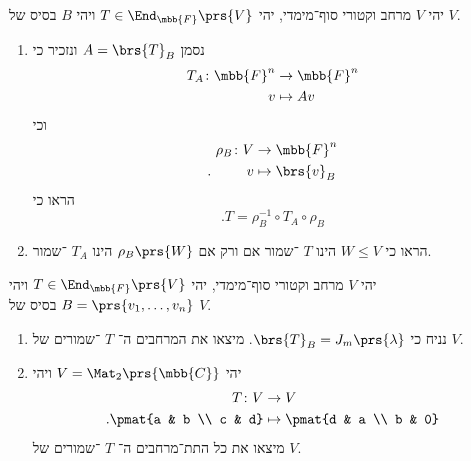 \documentclass[a4paper,10pt,twoside,openany]{article}
\begin{document}
\pagebreak

\begin{exercise}
יהי
$V$
מרחב וקטורי סוף־מימדי, יהי
$T \in \End_{\mbb{F}}\prs{V}$
ויהי
$B$
בסיס של
$V$.

\begin{enumerate}
\item נסמן
$A = \brs{T}_B$
ונזכיר כי
\begin{align*}
T_A \colon \mbb{F}^n &\to \mbb{F}^n \\
v &\mapsto Av
\end{align*}
וכי
\begin{align*}
\rho_B \colon V &\to \mbb{F}^n \\
\text{.} \hphantom{lalala} v &\mapsto \brs{v}_B
\end{align*}
הראו כי
\[\text{.} T = \rho_B^{-1} \circ T_A \circ \rho_B\]

\item
הראו כי
$W \leq V$
הינו
$T$%
־שמור אם ורק אם
$\rho_B\prs{W}$
הינו
$T_A$%
־שמור.
\end{enumerate}
\end{exercise}

\begin{exercise}
יהי
$V$
מרחב וקטורי סוף־מימדי, יהי
$T \in \End_{\mbb{F}}\prs{V}$
ויהי
$B = \prs{v_1, \ldots, v_n}$
בסיס של
$V$.
\begin{enumerate}
\item נניח כי
$\brs{T}_B = J_m\prs{\lambda}$.
מיצאו את המרחבים ה־%
$T$%
־שמורים של
$V$.

\item
יהי
$V = \Mat_2\prs{\mbb{C}}$
ויהי
\begin{align*}
T \colon V &\to V \\
\text{.} \pmat{a & b \\ c & d} &\mapsto \pmat{d & a \\ b & 0}
\end{align*}
מיצאו את כל התת־מרחבים ה־%
$T$%
־שמורים של
$V$.
\end{enumerate}
\end{exercise}
\end{document}
